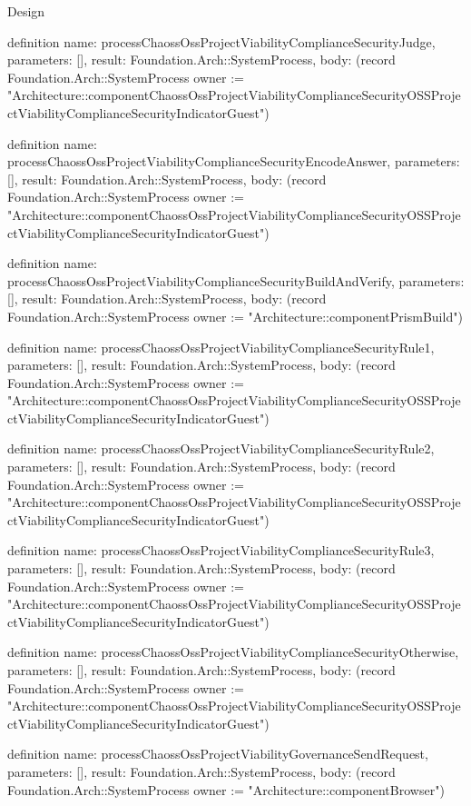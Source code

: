 \begin{lexlean}{Design}
\begin{semanticmodule}
definition{
  name: processChaossOssProjectViabilityComplianceSecurityJudge,
  parameters: [],
  result: Foundation.Arch::SystemProcess,
  body: (record Foundation.Arch::SystemProcess {owner := "Architecture::componentChaossOssProjectViabilityComplianceSecurityOSSProjectViabilityComplianceSecurityIndicatorGuest"})
}

definition{
  name: processChaossOssProjectViabilityComplianceSecurityEncodeAnswer,
  parameters: [],
  result: Foundation.Arch::SystemProcess,
  body: (record Foundation.Arch::SystemProcess {owner := "Architecture::componentChaossOssProjectViabilityComplianceSecurityOSSProjectViabilityComplianceSecurityIndicatorGuest"})
}

definition{
  name: processChaossOssProjectViabilityComplianceSecurityBuildAndVerify,
  parameters: [],
  result: Foundation.Arch::SystemProcess,
  body: (record Foundation.Arch::SystemProcess {owner := "Architecture::componentPrismBuild"})
}

definition{
  name: processChaossOssProjectViabilityComplianceSecurityRule1,
  parameters: [],
  result: Foundation.Arch::SystemProcess,
  body: (record Foundation.Arch::SystemProcess {owner := "Architecture::componentChaossOssProjectViabilityComplianceSecurityOSSProjectViabilityComplianceSecurityIndicatorGuest"})
}

definition{
  name: processChaossOssProjectViabilityComplianceSecurityRule2,
  parameters: [],
  result: Foundation.Arch::SystemProcess,
  body: (record Foundation.Arch::SystemProcess {owner := "Architecture::componentChaossOssProjectViabilityComplianceSecurityOSSProjectViabilityComplianceSecurityIndicatorGuest"})
}

definition{
  name: processChaossOssProjectViabilityComplianceSecurityRule3,
  parameters: [],
  result: Foundation.Arch::SystemProcess,
  body: (record Foundation.Arch::SystemProcess {owner := "Architecture::componentChaossOssProjectViabilityComplianceSecurityOSSProjectViabilityComplianceSecurityIndicatorGuest"})
}

definition{
  name: processChaossOssProjectViabilityComplianceSecurityOtherwise,
  parameters: [],
  result: Foundation.Arch::SystemProcess,
  body: (record Foundation.Arch::SystemProcess {owner := "Architecture::componentChaossOssProjectViabilityComplianceSecurityOSSProjectViabilityComplianceSecurityIndicatorGuest"})
}

definition{
  name: processChaossOssProjectViabilityGovernanceSendRequest,
  parameters: [],
  result: Foundation.Arch::SystemProcess,
  body: (record Foundation.Arch::SystemProcess {owner := "Architecture::componentBrowser"})
}


\end{semanticmodule}
\end{lexlean}
